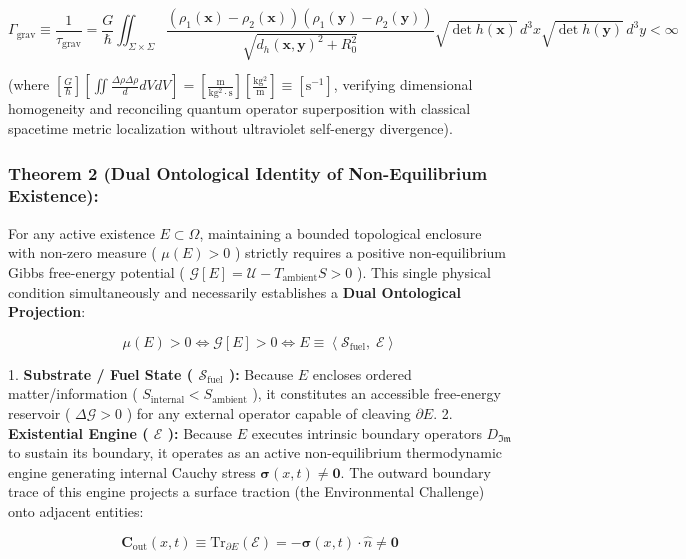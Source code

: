 \documentclass[11pt,a4paper]{article}
\theoremstyle{definition}
\theoremstyle{remark}
\begin{document}
\begin{equation}
\boxed{\Gamma_{\text{grav}} \equiv \frac{1}{\tau_{\text{grav}}} = \frac{G}{\hbar} \iint_{\Sigma \times \Sigma} \frac{\left( \rho_1(\mathbf{x}) - \rho_2(\mathbf{x}) \right) \left( \rho_1(\mathbf{y}) - \rho_2(\mathbf{y}) \right)}{\sqrt{d_h(\mathbf{x}, \mathbf{y})^2 + R_0^2}} \sqrt{\det h(\mathbf{x})} \, d^3x \sqrt{\det h(\mathbf{y})} \, d^3y < \infty}
\end{equation}


(where $[\frac{G}{\hbar}][\iint \frac{\Delta\rho\Delta\rho}{d} dV dV] = [\frac{\mathrm{m}}{\mathrm{kg^2 \cdot s}}][\frac{\mathrm{kg^2}}{\mathrm{m}}] \equiv [\mathrm{s^{-1}}]$, verifying dimensional homogeneity and reconciling quantum operator superposition with classical spacetime metric localization without ultraviolet self-energy divergence).

\subsubsection{Theorem 2 (Dual Ontological Identity of Non-Equilibrium Existence):}
For any active existence $E \subset \Omega$, maintaining a bounded topological enclosure with non-zero measure ( $\mu(E) > 0$ ) strictly requires a positive non-equilibrium Gibbs free-energy potential ( $\mathcal{G}[E] = \mathcal{U} - T_{\text{ambient}} S > 0$ ). This single physical condition simultaneously and necessarily establishes a \textbf{Dual Ontological Projection}:


\begin{equation}
\boxed{\mu(E) > 0 \iff \mathcal{G}[E] > 0 \iff E \equiv \left\langle \mathcal{S}_{\text{fuel}}, \; \mathcal{E} \right\rangle}
\end{equation}


1. \textbf{Substrate / Fuel State ( $\mathcal{S}_{\text{fuel}}$ ):} Because $E$ encloses ordered matter/information ( $S_{\text{internal}} < S_{\text{ambient}}$ ), it constitutes an accessible free-energy reservoir ( $\Delta \mathcal{G} > 0$ ) for any external operator capable of cleaving $\partial E$.
2. \textbf{Existential Engine ( $\mathcal{E}$ ):} Because $E$ executes intrinsic boundary operators $D_{\mathfrak{Im}}$ to sustain its boundary, it operates as an active non-equilibrium thermodynamic engine generating internal Cauchy stress $\boldsymbol{\sigma}(x, t) \neq \mathbf{0}$. The outward boundary trace of this engine projects a surface traction (the Environmental Challenge) onto adjacent entities:


\begin{equation}
\mathbf{C}_{\text{out}}(x, t) \equiv \mathrm{Tr}_{\partial E}\left(\mathcal{E}\right) = -\boldsymbol{\sigma}(x, t) \cdot \hat{n} \neq \mathbf{0}
\end{equation}
\end{document}
